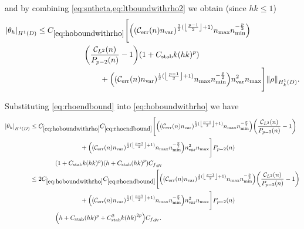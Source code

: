 and by combining \cref{eq:sntheta,eq:ltboundwithrho2} we obtain (since $hk \leq 1$)%
\begin{align}
  \SNHoD{\thetah} &\leq \CHobound \Bigg[ \mleft(\mleft(\En\nvar\mright)^{\half(\floor{\frac{p-1}2}+1)}\nmax\nmin^{-\frac{p}2}\mright)\nonumber\\
    &\quad\quad\quad\quad\quad\quad\mleft(\frac{\CLtn(n)}{\Pfn{p-2}\mleft(n\mright)}-1\mright)\mleft( 1 +  \CAnk k(hk)^p\mright)\nonumber\\
    &\quad\quad\quad\quad\quad\quad\quad\quad+\mleft(\mleft(\En\nvar\mright)^{\half(\floor{\frac{p-1}2}+1)}\nmax\nmin^{-\frac{p}2}\mright)\nvar^2\nmax \Bigg]\NHokD{\rho}.\label{eq:hoboundwithrho}
\end{align}

Substituting \cref{eq:rhoendbound} into \cref{eq:hoboundwithrho} we have
\begin{align}
\SNHoD{\thetah} &\leq \CHobound\Crhoendbound \Bigg[ \mleft(\mleft(\En\nvar\mright)^{\half(\floor{\frac{p-1}2}+1)}\nmax\nmin^{-\frac{p}2}\mright) \mleft(\frac{\CLtn(n)}{\Pfn{p-2}\mleft(n\mright)}-1\mright)\nonumber\\
  &\quad\quad\quad\quad\quad\quad\quad\quad+  \mleft(\mleft(\En\nvar\mright)^{\half(\floor{\frac{p-1}2}+1)}\nmax\nmin^{-\frac{p}2}\mright)\nvar^2\nmax \Bigg]\Pfn{p-2}\mleft(n\mright)\nonumber\\
&\quad\quad\quad\quad\mleft( 1 +  \CAnk k(hk)^p\mright)   \mleft( h +  \CAnk \mleft(hk\mright)^p\mright) \Cfg\nonumber\\
 &\leq 2\CHobound\Crhoendbound \Bigg[ \mleft(\mleft(\En\nvar\mright)^{\half(\floor{\frac{p-1}2}+1)}\nmax\nmin^{-\frac{p}2}\mright) \mleft(\frac{\CLtn(n)}{\Pfn{p-2}\mleft(n\mright)}-1\mright)\nonumber\\
  &\quad\quad\quad\quad\quad\quad\quad\quad+  \mleft(\mleft(\En\nvar\mright)^{\half(\floor{\frac{p-1}2}+1)}\nmax\nmin^{-\frac{p}2}\mright)\nvar^2\nmax \Bigg]\Pfn{p-2}\mleft(n\mright)\nonumber\\
&\quad\quad\quad\quad\mleft( h +  \CAnk (hk)^p + \CAnk^2 k\mleft(hk\mright)^{2p}\mright)\Cfg.\label{eq:thetahhonearly}
\end{align}

